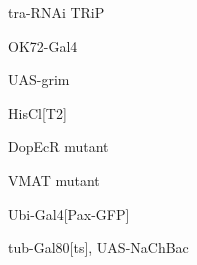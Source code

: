 \documentclass[17pt]{extarticle}
\begin{document}
\footnotesize
\vspace*{\fill}
\newpage{}
\vspace*{\fill}\begin{normalsize}
tra-RNAi TRiP \\[0.5em]
\end{normalsize}
\footnotesize
\vspace*{\fill}
\newpage{}
\vspace*{\fill}\begin{large}
OK72-Gal4 \\[0.5em]
\end{large}
\footnotesize
\vspace*{\fill}
\newpage{}
\vspace*{\fill}\begin{large}
UAS-grim \\[0.5em]
\end{large}
\footnotesize
\vspace*{\fill}
\newpage{}
\vspace*{\fill}\begin{large}
HisCl[T2] \\[0.5em]
\end{large}
\footnotesize
\vspace*{\fill}
\newpage{}
\vspace*{\fill}\begin{normalsize}
DopEcR mutant \\[0.5em]
\end{normalsize}
\footnotesize
\vspace*{\fill}
\newpage{}
\vspace*{\fill}\begin{normalsize}
VMAT mutant \\[0.5em]
\end{normalsize}
\footnotesize
\vspace*{\fill}
\newpage{}
\vspace*{\fill}\begin{small}
Ubi-Gal4[Pax-GFP] \\[0.5em]
\end{small}
\footnotesize
\vspace*{\fill}
\newpage{}
\vspace*{\fill}\begin{footnotesize}
tub-Gal80[ts], UAS-NaChBac \\[0.5em]
\end{footnotesize}
\footnotesize
\vspace*{\fill}
\end{document}
